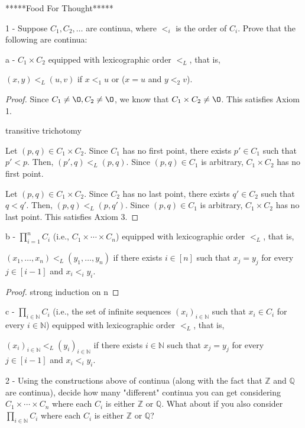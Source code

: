 \documentclass[11pt]{article}
\renewcommand{\emptyset}{\O}
\renewcommand{\_}[1]{\underline{ #1 }}
\theoremstyle{definition}
\numberwithin{equation}{subsection}
\begin{document}
\begin{enumerate}
\begin{enumerate}
\end{enumerate}


*****Food For Thought*****

1 - Suppose $C_1, C_2, \ldots$ are continua, where $<_i$ is the order of $C_i$. Prove that the following are continua:

a - $C_1\times C_2$ equipped with lexicographic order $<_L$, that is,

$(x,y) <_L (u,v)$ if $x <_1 u$ or ($x = u$ and $y <_2 v$).

\begin{proof}
Since $C_1 \not= \emptyset, C_2 \not= \emptyset$, we know that $C_1 \times C_2 \not= \emptyset$. This satisfies Axiom 1.

transitive
trichotomy

Let $(p,q) \in C_1 \times C_2$. Since $C_1$ has no first point, there exists $p' \in C_1$ such that $p'<p$. Then, $(p',q) <_L (p,q)$. Since $(p,q) \in C_1$ is arbitrary, $C_1 \times C_2$ has no first point.

Let $(p,q) \in C_1 \times C_2$. Since $C_2$ has no last point, there exists $q' \in C_2$ such that $q<q'$. Then, $(p,q) <_L (p,q')$. Since $(p,q) \in C_1$ is arbitrary, $C_1 \times C_2$ has no last point. This satisfies Axiom 3.


\renewcommand\qedsymbol{QED}
\end{proof}

b - $\prod_{i=1}^n C_i$ (i.e., $C_1\times\cdots\times C_n$) equipped with lexicographic order $<_L$, that is,

$(x_1,\ldots,x_n) <_L (y_1,\ldots, y_n)$ if there exists $i\in[n]$ such that $x_j = y_j$ for every $j\in[i-1]$ and $x_i <_i y_i$.

\begin{proof}
strong induction on n

\renewcommand\qedsymbol{QED}
\end{proof}

c - $\prod_{i\in\mathbb{N}} C_i$ (i.e., the set of infinite sequences $(x_i)_{i\in\mathbb{N}}$ such that $x_i\in C_i$ for every $i\in\mathbb{N}$) equipped with lexicographic order $<_L$, that is,

$(x_i)_{i\in\mathbb{N}} <_L (y_i)_{i\in\mathbb{N}}$ if there exists $i\in\mathbb{N}$ such that $x_j = y_j$ for every $j\in[i-1]$ and $x_i <_i y_i$.

2 - Using the constructions above of continua (along with the fact that $\mathbb{Z}$ and $\mathbb{Q}$ are continua), decide how many "different" continua you can get considering $C_1\times\cdots\times C_n$ where each $C_i$ is either $\mathbb{Z}$ or $\mathbb{Q}$.  What about if you also consider $\prod_{i\in\mathbb{N}} C_i$ where each $C_i$ is either $\mathbb{Z}$ or $\mathbb{Q}$?



\end{enumerate}
\end{document}
